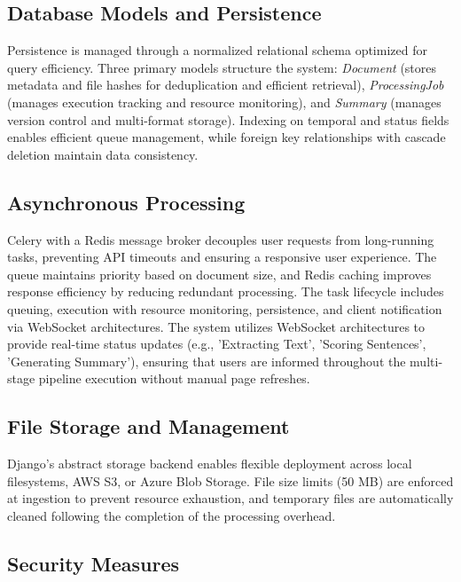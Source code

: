 \documentclass[conference]{IEEEtran}
\begin{document}
\subsection{Database Models and Persistence}

Persistence is managed through a normalized relational schema optimized for query efficiency. Three primary models structure the system: \textit{Document} (stores metadata and file hashes for deduplication and efficient retrieval), \textit{ProcessingJob} (manages execution tracking and resource monitoring), and \textit{Summary} (manages version control and multi-format storage). Indexing on temporal and status fields enables efficient queue management, while foreign key relationships with cascade deletion maintain data consistency.

\subsection{Asynchronous Processing}

Celery with a Redis message broker decouples user requests from long-running tasks, preventing API timeouts and ensuring a responsive user experience. The queue maintains priority based on document size, and Redis caching improves response efficiency by reducing redundant processing. The task lifecycle includes queuing, execution with resource monitoring, persistence, and client notification via WebSocket architectures. The system utilizes WebSocket architectures to provide real-time status updates (e.g., 'Extracting Text', 'Scoring Sentences', 'Generating Summary'), ensuring that users are informed throughout the multi-stage pipeline execution without manual page refreshes.

\subsection{File Storage and Management}

Django's abstract storage backend enables flexible deployment across local filesystems, AWS S3, or Azure Blob Storage. File size limits (50 MB) are enforced at ingestion to prevent resource exhaustion, and temporary files are automatically cleaned following the completion of the processing overhead.

\subsection{Security Measures}
\end{document}
